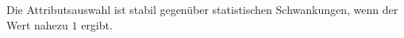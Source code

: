 Die Attributsauswahl ist stabil gegenüber statistischen Schwankungen, wenn der Wert nahezu $1$ ergibt.
